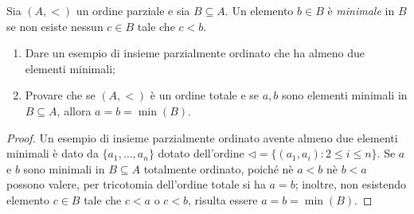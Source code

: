 \begin{exe}
  Sia \((A,<)\) un ordine parziale e sia \(B \subseteq A\). Un elemento \(b \in B\) è \emph{minimale} in \(B\) se non esiste nessun \(c \in B\) tale che \(c < b\).
  \begin{enumerate}
    \item Dare un esempio di insieme parzialmente ordinato che ha almeno due elementi minimali;
    \item Provare che se \((A,<)\) è un ordine totale e se \(a,b\) sono elementi minimali in \(B \subseteq A\), allora \(a = b = \min(B)\).
  \end{enumerate}
\end{exe}
\begin{proof}
  Un esempio di insieme parzialmente ordinato avente almeno due elementi minimali è dato da \(\lbrace a_1,\dots,a_n \rbrace\) dotato dell'ordine \(\lhd = \lbrace (a_1,a_i) \colon 2 \le i \le n \rbrace\). Se \(a\) e \(b\) sono minimali in \(B \subseteq A\) totalmente ordinato, poiché nè \(a < b\) nè \(b < a\) possono valere, per tricotomia dell'ordine totale si ha \(a = b\); inoltre, non esistendo elemento \(c \in B\) tale che \(c < a\) o \(c < b\), risulta essere \(a = b = \min(B)\).
\end{proof}

